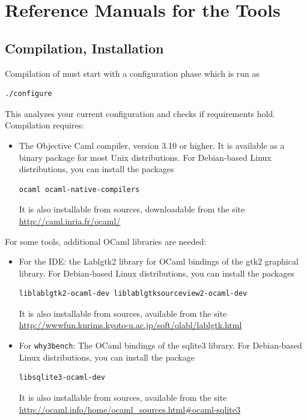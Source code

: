 \chapter{Reference Manuals for the \why Tools}
\label{chap:manpages}

\section{Compilation, Installation}
\label{sec:install}


Compilation of \why must start with a configuration phase which is run as
\begin{verbatim}
./configure
\end{verbatim}
This analyzes your current configuration and checks if requirements hold.
Compilation requires:
\begin{itemize}
\item The Objective Caml compiler, version 3.10 or higher. It is
  available as a binary package for most Unix distributions. For
  Debian-based Linux distributions, you can install the packages
\begin{verbatim}
ocaml ocaml-native-compilers
\end{verbatim}
It is also installable from sources, downloadable from the site
\url{http://caml.inria.fr/ocaml/}
\end{itemize}

\noindent
For some tools, additional OCaml libraries are needed:
\begin{itemize}
\item For the IDE: the Lablgtk2 library for OCaml bindings of the gtk2
  graphical library. For Debian-based Linux distributions, you can
  install the packages
\begin{verbatim}
liblablgtk2-ocaml-dev liblablgtksourceview2-ocaml-dev
\end{verbatim}
It is also installable from sources, available from the site
\url{http://wwwfun.kurims.kyoto-u.ac.jp/soft/olabl/lablgtk.html}

\item For \texttt{why3bench}: The OCaml bindings of the sqlite3 library.
For Debian-based Linux distributions, you can install the package
\begin{verbatim}
libsqlite3-ocaml-dev
\end{verbatim}
It is also installable from sources, available from the site
\url{http://ocaml.info/home/ocaml_sources.html#ocaml-sqlite3}
\end{itemize}

